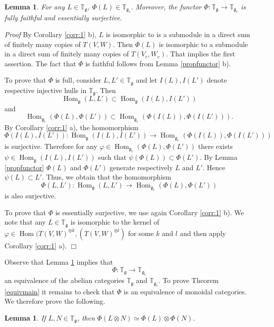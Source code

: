 \documentclass[10pt]{amsart}
\newcounter{theorem}
\newtheorem{lemma}[theo]{Lemma}
\renewenvironment{proof}{ \emph{Proof}}{$\Box$}
\newcommand{\TT}{\mathbb{T}}
\renewcommand{\gg}{\mathfrak{g}}
\begin{document}
\begin{lemma}\label{functor} For any $L\in \TT_\gg$, $\Phi(L)\in  \TT_{\gg_c}$. Moreover,
the functor $\Phi: \TT_\gg\to\TT_{\gg_c}$ is fully faithful and essentially surjective.
\end{lemma}
\begin{proof} By Corollary \ref{corr:1} b), $L$ is isomorphic to
is a submodule in a direct sum of finitely many copies of
$T(V,W)$. Then $\Phi(L)$ is isomorphic to a submodule in  a direct sum of finitely
many copies of $T(V_c,W_c)$. That implies the first assertion. The
fact that $\Phi$ is faithful follows from Lemma \ref{propfunctor}
b). 

To prove that $\Phi$ is full, consider $L,L'\in  \TT_\gg$ and let
$I(L),I(L')$ denote respective injective hulls in $\TT_\gg$. Then 
$$\operatorname{Hom}_\gg(L,L')\subset\operatorname{Hom}_\gg(I(L),I(L'))$$ and 
$$\operatorname{Hom}_{\gg_c}(\Phi(L),\Phi(L'))\subset\operatorname{Hom}_{\gg_c}(\Phi(I(L)),\Phi(I(L'))).$$ By
Corollary \ref{corr:1} a), the homomorphism
$$\Phi(I(L),I(L')):\operatorname{Hom}_\gg(I(L),I(L'))\to\operatorname{Hom}_{\gg_c}(\Phi(I(L)),\Phi(I(L')))$$ 
is surjective. Therefore for any $\varphi\in \operatorname{Hom}_{\gg_c}(\Phi(L),\Phi(L'))$ there exists 
$\psi\in \operatorname{Hom}_\gg(I(L),I(L'))$ such that $\psi(\Phi(L))\subset \Phi(L')$. By Lemma \ref{propfunctor}  
$\Phi(L)$ and $\Phi(L')$ generate respectively
$L$ and $L'$. Hence $\psi(L)\subset L'$. Thus, we obtain that
the homomorphism 
$$\Phi(L,L'):\operatorname{Hom}_\gg(L,L')\to\operatorname{Hom}_{\gg_c}(\Phi(L),\Phi(L'))$$ is also surjective. 

To prove that $\Phi$ is essentially surjective, we use again
Corollary \ref{corr:1} b). We note that any $L\in  \TT_\gg$ is
isomorphic to the kernel of $\varphi\in\operatorname{Hom}(T(V,W)^{\oplus k},(T(V,W)^{\oplus l})$
for some $k$ and $l$ and then apply Corollary \ref{corr:1} a).
\end{proof}

Observe that Lemma \ref{functor} implies that $$\Phi:\TT_\gg \rightarrow \TT_{\gg_c}$$ an equivalence of the abelian
categories $\TT_\gg$ and $\TT_{\gg_c}$.
To prove Theorem \ref{equivmain} it remains 
to check that $\Phi$ is an equivalence of monoidal categories. We therefore prove the following.

\begin{lemma}\label{tensphi} If $L,N\in\TT_{\gg}$, then $\Phi(L\otimes N)\simeq \Phi(L)\otimes \Phi(N)$.
\end{lemma}
\end{document}
